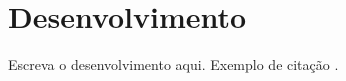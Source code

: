 \section{Desenvolvimento}

Escreva o desenvolvimento aqui. Exemplo de citação \cite{Brasil2018LGPD}.